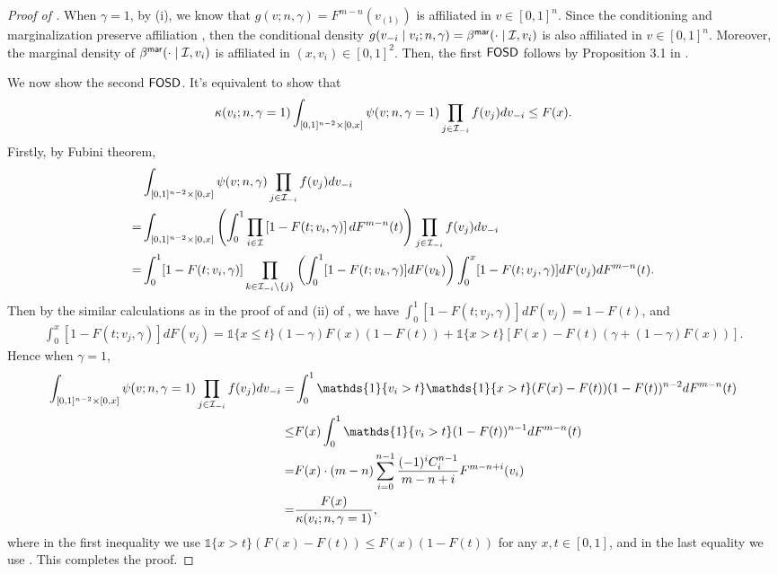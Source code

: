 \begin{proof}[{Proof of }] When $\gamma=1$, by  (i), we know that $g(v;n,\gamma) = F^{m-n}(v_{(1)})$ is affiliated in $v\in [0,1]^n$.
Since the conditioning and marginalization preserve affiliation \citep{karlin_1980_MTP2}, then the conditional density $g(v_{-i}\mid v_i;n,\gamma) = \beta^{\mathsf{mar}}(\cdot \mid \mathcal{I},v_i)$ is also affiliated in $v\in [0,1]^n$. Moreover, the marginal density of $\beta^{\mathsf{mar}}(\cdot \mid \mathcal{I},v_i)$ is affiliated in $(x,v_i)\in [0,1]^2$. Then, the first $\mathsf{FOSD}$ follows by Proposition 3.1 in \citet{castro_2007_affiliation_positive_dependence}. 

We now show the second $\mathsf{FOSD}$. It's equivalent to show that 
\begin{align*}
\kappa(v_i;n,\gamma=1)  \int_{ [0,1]^{n-2}\times[0,x]} \psi(v;n,\gamma=1) \prod_{j\in \mathcal{I}_{-i}} f(v_j) dv_{-i} \leq F(x).   
\end{align*}
Firstly, by Fubini theorem,
\begin{align*}
 &\int_{ [0,1]^{n-2}\times[0,x]} \psi(v;n,\gamma) \prod_{j\in \mathcal{I}_{-i}} f(v_j) dv_{-i}\\
 =& \int_{ [0,1]^{n-2}\times [0,x]}  \left(\int_0^1\prod_{i\in \mathcal{I}}\left[1-F(t;v_i,\gamma)\right] dF^{m-n}(t)\right)\prod_{j\in \mathcal{I}_{-i}} f(v_j) dv_{-i}\\
 =& \int_0^1 [1-F(t;v_i,\gamma)]\prod_{k\in \mathcal{I}_{-i}\backslash \{j\}}\left(\int_0^1 [1-F(t;v_k,\gamma)]dF(v_k)\right)\int_0^x [1-F(t;v_j,\gamma)]dF(v_j)dF^{m-n}(t).
\end{align*}
Then by the similar calculations as in the proof of  and (ii) of , we have $\int_0^1 [1-F(t;v_j,\gamma)]dF(v_j) = 1-F(t)$, and
\begin{align*}
\int_0^x [1-F(t;v_j,\gamma)]dF(v_j) 
=\mathds{1}\{x\leq t\} (1-\gamma)F(x)(1-F(t)) + \mathds{1}\{x> t\} \left[F(x) - F(t)(\gamma + (1-\gamma)F(x))\right].
\end{align*}
Hence when $\gamma = 1$, 
\begin{align*}
\int_{ [0,1]^{n-2}\times[0,x]} \psi(v;n,\gamma = 1) \prod_{j\in \I_{-i}} f(v_j) dv_{-i} =& \int_0^1 \mathds{1}\{v_i>t\} \mathds{1}\{x>t\}(F(x) - F(t)) (1-F(t))^{n-2}dF^{m-n}(t) \\ 
\leq &F(x)\int_0^1 \mathds{1}\{v_i>t\} (1-F(t))^{n-1}dF^{m-n}(t)\\
=& F(x) \cdot (m-n)\sum_{i=0}^{n-1}\frac{(-1)^iC^{n-1}_i}{m-n+i} F^{m-n+i}(v_i)\\
=&\frac{F(x)}{\kappa(v_i;n,\gamma = 1)},
\end{align*}
where in the first inequality we use $\mathds{1}\{x>t\}(F(x)-F(t))\leq F(x)(1-F(t))$ for any $x,t \in [0,1]$, and in the last equality we use .
This completes the proof.
\end{proof}


